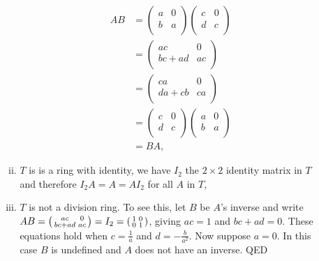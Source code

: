 \documentclass[10pt]{article}
\begin{document}
\begin{enumerate}
\begin{enumerate}
\begin{enumerate}[(i)]
            \begin{align*}
              AB &=
              \begin{pmatrix} a & 0 \\ b & a \\ \end{pmatrix}
              \begin{pmatrix} c & 0 \\ d & c \\ \end{pmatrix} \\
                &= \begin{pmatrix} ac & 0 \\ bc + ad & ac \\ \end{pmatrix} \\
                &= \begin{pmatrix} ca & 0 \\ da + cb & ca \\ \end{pmatrix} \\
              &=
              \begin{pmatrix} c & 0 \\ d & c \\ \end{pmatrix}
              \begin{pmatrix} a & 0 \\ b & a \\ \end{pmatrix} \\
              &= BA,
            \end{align*}
          \item $T$ is is a ring with identity, we have $I_2$ the $2\times 2$
              identity matrix in $T$ and therefore $I_2A = A = AI_2$ for all
              $A$ in $T$,
            \item $T$ is not a division ring. To see this, let $B$ be $A$'s
              inverse and write 
            $
            AB =
            \begin{psmallmatrix} ac & 0 \\ bc + ad & ac \\ \end{psmallmatrix}
            = I_2 =
            \begin{psmallmatrix} 1 & 0 \\ 0 & 1 \\ \end{psmallmatrix}
            $, giving
              $ac = 1$ and $bc + ad = 0$. These equations hold when
              $c = \tfrac{1}{a}$ and $d = -\tfrac{b}{a^2}$. Now suppose $a =
              0$. In this case $B$ is undefined and $A$ does not have an
              inverse. QED


\end{enumerate}
\end{enumerate}
\end{enumerate}
\end{document}
